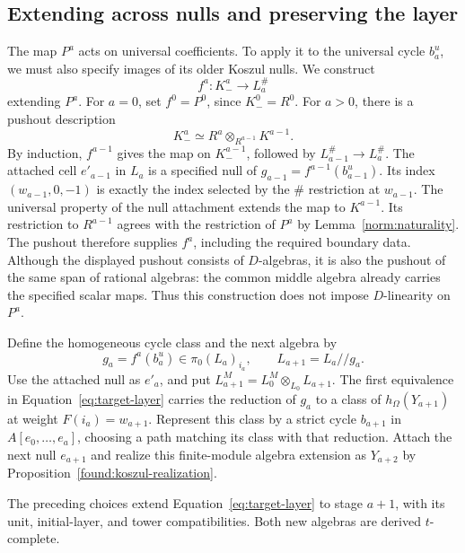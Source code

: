 \subsection{Extending across nulls and preserving the layer}

The map $P^a$ acts on universal coefficients.  To apply it to the
universal cycle $b_a^u$, we must also specify images of its older
Koszul nulls.  We construct
\[
 f^a:K_-^a\longrightarrow L_a^\#
\]
extending $P^a$.  For $a=0$, set $f^0=P^0$, since $K_-^0=R^0$.
For $a>0$, there is a pushout description
\[
 K_-^a\simeq R^a\otimes_{R^{a-1}}K^{a-1}.
\]
By induction, $f^{a-1}$ gives the map on $K_-^{a-1}$, followed by
$L_{a-1}^\#\to L_a^\#$.  The attached cell $e'_{a-1}$ in $L_a$
is a specified null of
$g_{a-1}=f^{a-1}(b_{a-1}^u)$.  Its index
$(w_{a-1},0,-1)$ is exactly the index selected by the $\#$ restriction
at $w_{a-1}$.  The universal property of the null attachment extends
the map to $K^{a-1}$.  Its restriction to $R^{a-1}$ agrees with the
restriction of $P^a$ by Lemma~\ref{norm:naturality}.  The pushout
therefore supplies $f^a$, including the required boundary data.
Although the displayed pushout consists of $D$-algebras, it is also
the pushout of the same span of rational algebras: the common middle
algebra already carries the specified scalar maps.  Thus this
construction does not impose $D$-linearity on $P^a$.

Define the homogeneous cycle class and the next algebra by
\begin{equation}
\label{norm:next-cell}
 g_a=f^a(b_a^u)\in\pi_0(L_a)_{i_a},
 \qquad L_{a+1}=L_a//g_a.
\end{equation}
Use the attached null as $e'_a$, and put
$L_{a+1}^M=L_0^M\otimes_{L_0}L_{a+1}$.
The first equivalence in Equation~\eqref{eq:target-layer} carries
the reduction of $g_a$ to a class of
$h_\Omega(Y_{a+1})$ at weight $F(i_a)=w_{a+1}$.  Represent this
class by a strict cycle $b_{a+1}$ in $A[e_0,\ldots,e_a]$, choosing
a path matching its class with that reduction.  Attach the next
null $e_{a+1}$ and realize this finite-module algebra extension as
$Y_{a+2}$ by Proposition~\ref{found:koszul-realization}.

\begin{lemma}
\label{norm:attachment}
The preceding choices extend Equation~\eqref{eq:target-layer} to
stage $a+1$, with its unit, initial-layer, and tower compatibilities.
Both new algebras are derived $t$-complete.
\end{lemma}

